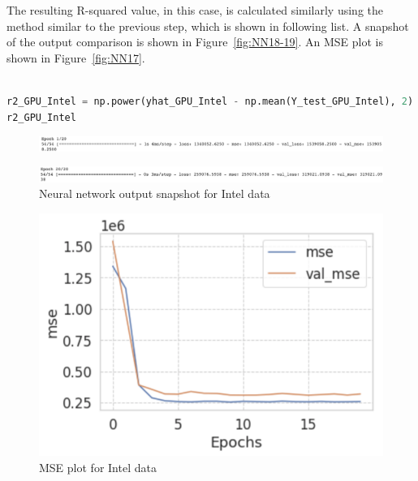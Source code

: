 \documentclass{scrartcl}
\begin{document}
\noindent The resulting R-squared value, in this case, is calculated similarly using the method similar to the previous step, which is shown in following list. A snapshot of the output comparison is shown in Figure~\ref{fig:NN18-19}. An MSE plot is shown in Figure~\ref{fig:NN17}. \\

\begin{lstlisting}[language=Python, caption= Code output for MSE Intel training,basicstyle=\tiny,captionpos=b]

r2_GPU_Intel = np.power(yhat_GPU_Intel - np.mean(Y_test_GPU_Intel), 2).sum() / np.power(Y_test_GPU_Intel - np.mean(Y_test_GPU_Intel), 2).sum()
r2_GPU_Intel

\end{lstlisting}

\begin{figure}
         \centering
         \includegraphics[width=\textwidth]{Graphics/Neural Network Images/NN24.png}
\end{figure}
     
\begin{figure}
         \centering
         \includegraphics[width=\textwidth]{Graphics/Neural Network Images/NN25.png}
         \caption{Neural network output snapshot for Intel data}
         \label{fig:NN24-25}
\end{figure}


\begin{figure}[H]
	\begin{center}
		\includegraphics[scale=1.0]{Graphics/Neural Network Images/NN23.png}
	\end{center}
	\caption{MSE plot for Intel data}
	\label{fig:NN23}
\end{figure}
\end{document}
